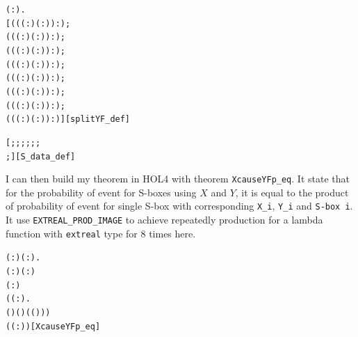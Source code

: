 \documentclass{article}
\begin{document}
\begin{alltt}
\HOLTokenTurnstile{} \HOLSymConst{\HOLTokenForall{}}( :).
       \HOLSymConst{=}
     [((( :) \HOLSymConst{\HOLTokenExtract{}} ( :))  :);
      ((( :) \HOLSymConst{\HOLTokenExtract{}} ( :))  :);
      ((( :) \HOLSymConst{\HOLTokenExtract{}} ( :))  :);
      ((( :) \HOLSymConst{\HOLTokenExtract{}} ( :))  :);
      ((( :) \HOLSymConst{\HOLTokenExtract{}} ( :))  :);
      ((( :) \HOLSymConst{\HOLTokenExtract{}} ( :))  :);
      ((( :) \HOLSymConst{\HOLTokenExtract{}} ( :))  :);
      ((( :) \HOLSymConst{\HOLTokenExtract{}} ( :))  :)]\hfill{[splitYF_def]}
\end{alltt}

\begin{alltt}
\HOLTokenTurnstile{}  \HOLSymConst{=}
   [; ; ; ; ; ;
    ; ]\hfill{[S_data_def]}
\end{alltt}

I can then build my theorem in HOL4 with theorem \verb|XcauseYFp_eq|. It state that for the probability of event for S-boxes using $X$ and
$Y$, it is equal to the product of probability of event for single S-box with corresponding \verb|X_i|, \verb|Y_i| and \verb|S-box i|. It
use \verb|EXTREAL_PROD_IMAGE| to achieve repeatedly production for a lambda function with \verb|extreal| type for $8$ times here.

\begin{alltt}
\HOLTokenTurnstile{} \HOLSymConst{\HOLTokenForall{}}( :) ( :).
     ( :) \HOLSymConst{=}   \HOLSymConst{\HOLTokenConj{}} ( : ) \HOLSymConst{=}   \HOLSymConst{\HOLTokenConj{}}
     ( : ) \HOLSymConst{=}   \HOLSymConst{\HOLTokenImp{}}
        \HOLSymConst{=}
     \HOLSymConst{\HOLTokenPI{}}
       (\HOLTokenLambda{}( :).
             (  ) (  ) ( (  )))
       ( ( :))\hfill{[XcauseYFp_eq]}
\end{alltt}
\end{document}

